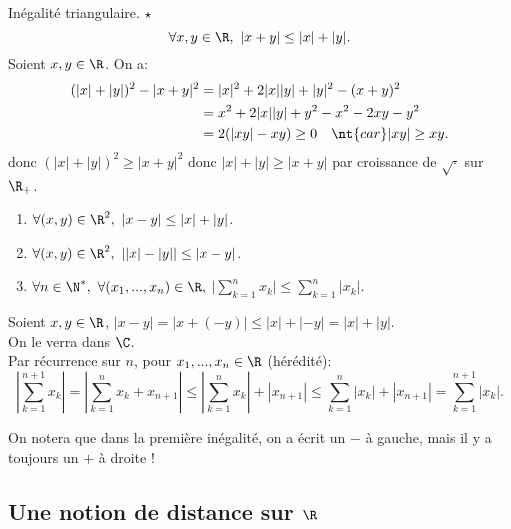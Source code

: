 \documentclass[11pt]{article}
\begin{document}
\begin{thm}{Inégalité triangulaire. $\star$}{}
    \begin{equation*}
        \forall x,y\in\R,~|x+y|\leq|x|+|y|.
    \end{equation*}
    \tcblower
    Soient $x,y\in\R$. On a:
    \begin{align*}
        (|x|+|y|)^2 - |x+y|^2 &= |x|^2+2|x||y|+|y|^2-(x+y)^2\\
        &= x^2 + 2|x||y| + y^2 - x^2 - 2xy - y^2\\
        &= 2(|xy|-xy)\geq 0 \quad \nt{car } |xy|\geq xy.
    \end{align*}
    donc $(|x|+|y|)^2\geq |x+y|^2$ donc $|x|+|y|\geq|x+y|$ par croissance de $\sqrt{\cdot}$ sur $\R_+$.
\end{thm}

\begin{corr}{}{}
    \begin{enumerate}
        \item $\forall (x,y)\in\R^2,~|x-y|\leq|x|+|y|$.
        \item $\forall (x,y)\in\R^2,~||x|-|y||\leq|x-y|$.
        \item $\forall n\in\N^*,~\forall (x_1,...,x_n)\in\R,~$\large$\Big|\sum\limits_{k=1}^nx_k\Big|\leq\sum\limits_{k=1}^n|x_k|$.
    \end{enumerate}
    \tcblower
     Soient $x,y\in\R$, $|x-y|=|x+(-y)|\leq|x|+|-y|=|x|+|y|$.\\
     On le verra dans $\C$.\\
     Par récurrence sur $n$, pour $x_1,...,x_n\in\R$ (hérédité):
    \begin{equation*}
        \left|\sum_{k=1}^{n+1}x_k\right|=\left|\sum_{k=1}^nx_k+x_{n+1}\right|\leq\left|\sum_{k=1}^nx_k\right|+|x_{n+1}|\leq\sum_{k=1}^n|x_k|+|x_{n+1}|=\sum_{k=1}^{n+1}|x_k|.
    \end{equation*}
\end{corr}

\warning On notera que dans la première inégalité, on a écrit un $-$ à gauche, mais il y a toujours un $+$ à droite !

\subsection{Une notion de distance sur \texorpdfstring{$\R$}{Lg}}

\begin{center}
\end{center}
\end{document}
